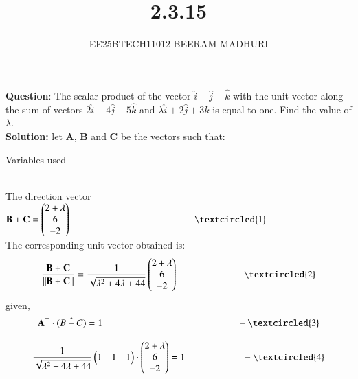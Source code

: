 \documentclass[journal]{IEEEtran}
\begin{document}

\vspace{3cm}

\title{2.3.15}
\author{EE25BTECH11012-BEERAM MADHURI}
{\let\newpage\relax\maketitle}

\renewcommand{\thefigure}{\theenumi}
\renewcommand{\thetable}{\theenumi}
\setlength{\intextsep}{10pt} %


\renewcommand{\thetable}{\theenumi}


\textbf{Question}:
The scalar product of the vector $\hat{i}+\hat{j}+\hat{k}$ with the unit vector along the sum of vectors $2\hat{i} + 4\hat{j} - 5\hat{k}$ and $\lambda \hat{i} + 2\hat{j} + 3\hat{k}$ is equal to one. Find the value of $\lambda$.\\
\textbf{Solution: }
let $\mathbf{A}$, $\mathbf{B}$ and $\mathbf{C}$ be the vectors such that:
\begin{table}[h!]
    \centering
    
    \caption{Variables used}
    \label{table 1.9.1}
\end{table}\\
The direction vector $\mathbf{B}+\mathbf{C} = \begin{pmatrix} 2+\lambda \\ 6 \\ -2 \end{pmatrix} \qquad  \qquad  \qquad   \qquad \qquad \qquad -\textcircled{1}$ \\

The corresponding unit vector obtained is:
\[\frac{\vec{B} + \vec{C}}{\|\vec{B} + \vec{C}\|} =
\frac{1}{\sqrt{\lambda^2 + 4\lambda + 44}} \begin{pmatrix} 2+\lambda \\ 6 \\ -2 \end{pmatrix}  \qquad \qquad \qquad -\textcircled{2}\]
given,
\[ \mathbf{A^\top} \cdot (\hat{B+C}) = 1  \qquad  \qquad  \qquad \qquad \qquad \qquad \qquad -\textcircled{3}\]

\[\frac{1}{\sqrt{\lambda^2 + 4\lambda + 44}} \begin{pmatrix}1 & 1 & 1 \end{pmatrix} \cdot \begin{pmatrix} 2+\lambda \\ 6 \\ -2 \end{pmatrix} = 1  \qquad \qquad \qquad-\textcircled{4}\]
\end{document}
